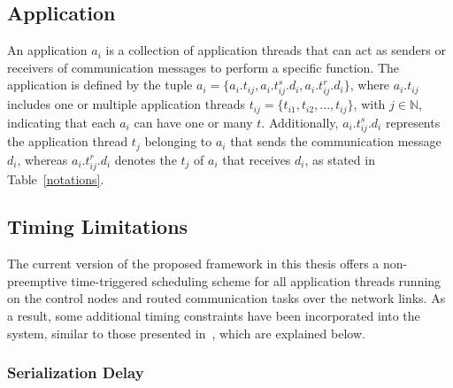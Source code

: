 \begin{figure}[t!]
    	\label{routing_rh_new}
        \end{figure}
    
    \subsection{Application}
    
    An application $a_i$ is a collection of application threads that can act as senders or receivers of communication messages to perform a specific function. The application is defined by the tuple $a_i = \{a_i.t_{ij}, a_i.t_{ij}^{s}.d_i, a_i.t_{ij}^{r}.d_i\}$, where $a_i.t_{ij}$ includes one or multiple application threads $t_{ij} = \{t_{i1}, t_{i2}, ..., t_{ij}\}$, with $j \in \mathbb{N}$, indicating that each $a_i$ can have one or many $t$. Additionally, $a_i.t_{ij}^{s}.d_i$ represents the application thread $t_{j}$ belonging to $a_i$ that sends the communication message $d_i$, whereas $a_i.t_{ij}^{r}.d_i$ denotes the $t_{j}$ of $a_i$ that receives $d_i$, as stated in Table~\ref{notations}.


    \subsection{Timing Limitations}
    
    The current version of the proposed framework in this thesis offers a non-preemptive time-triggered scheduling scheme for all application threads running on the control nodes and routed communication tasks over the network links. As a result, some additional timing constraints have been incorporated into the system, similar to those presented in~\cite{zhang2014task}, which are explained below.
    
    \subsubsection{Serialization Delay}
    

